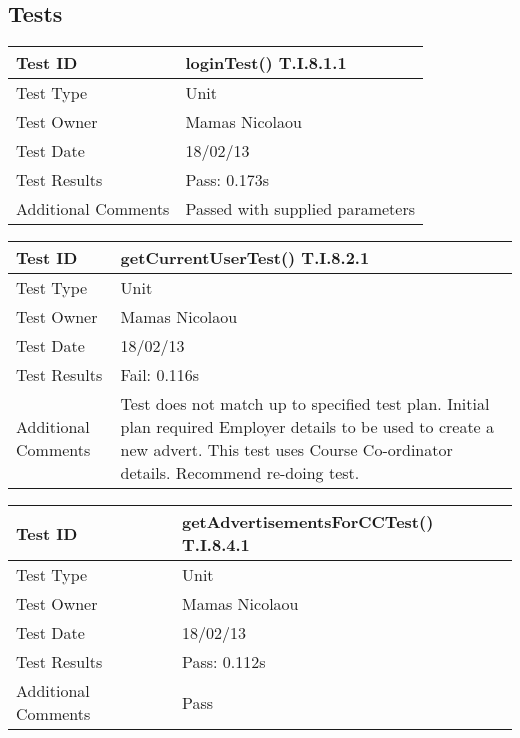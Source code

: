 \documentclass{l3deliverable}
\begin{document}
\subsection{Tests}

\begin{tabular}{|p{2cm}|p{12cm}|}
\hline
Test ID & loginTest() T.I.8.1.1\\
\hline
Test Type & Unit\\
\hline
Test Owner  & Mamas Nicolaou\\
\hline
Test Date & 18/02/13\\
\hline
Test Results & Pass: 0.173s\\
\hline
Additional Comments & Passed with supplied parameters\\
\hline
\end{tabular}

\vspace{4 mm}

\begin{tabular}{|p{2cm}|p{12cm}|}
\hline
Test ID & getCurrentUserTest() T.I.8.2.1\\
\hline
Test Type & Unit\\
\hline
Test Owner  & Mamas Nicolaou\\
\hline
Test Date & 18/02/13\\
\hline
Test Results & Fail: 0.116s\\
\hline
Additional Comments & Test does not match up to specified test plan. Initial plan required Employer details to be used to create a new advert. This test uses Course Co-ordinator details. Recommend re-doing test.\\
\hline
\end{tabular}

\vspace{4 mm}

\begin{tabular}{|p{2cm}|p{12cm}|}
\hline
Test ID & getAdvertisementsForCCTest() T.I.8.4.1\\
\hline
Test Type & Unit\\
\hline
Test Owner  & Mamas Nicolaou\\
\hline
Test Date & 18/02/13\\
\hline
Test Results & Pass: 0.112s\\
\hline
Additional Comments & Pass\\
\hline
\end{tabular}

\vspace{4 mm}
\end{document}

